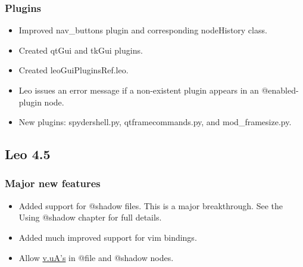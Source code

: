 \documentclass[a4paper,10pt,english]{sphinxmanual}
\begin{document}
\subsubsection{Plugins}
\label{what-is-new:id8}\begin{itemize}
\item {} 
Improved nav\_buttons plugin and corresponding nodeHistory class.

\item {} 
Created qtGui and tkGui plugins.

\item {} 
Created leoGuiPluginsRef.leo.

\item {} 
Leo issues an error message if a non-existent plugin appears
in an @enabled-plugin node.

\item {} 
New plugins: spydershell.py, qtframecommands.py, and mod\_framesize.py.

\end{itemize}


\subsection{Leo 4.5}
\label{what-is-new:leo-4-5}

\subsubsection{Major new features}
\label{what-is-new:major-new-features}\begin{itemize}
\item {} 
Added support for @shadow files.
This is a major breakthrough.
See the Using @shadow chapter for full details.

\item {} 
Added much improved support for vim bindings.

\item {} 
Allow \href{http://groups.google.com/group/leo-editor/browse\_thread/thread/750bb3099090f5b}{v.uA's} in @file and @shadow nodes.

\end{itemize}
\end{document}
